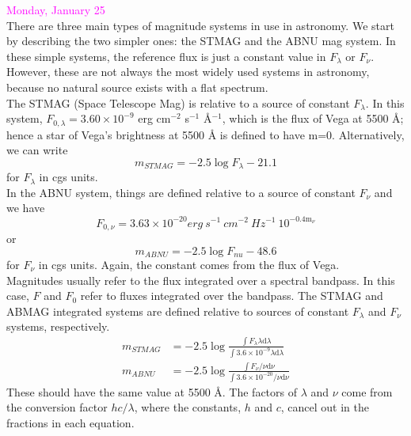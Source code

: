 \documentclass[12pt]{article}
\begin{document}
\noindent \textcolor{magenta}{Monday, January 25}\\

\noindent There are three main types of magnitude systems in use in astronomy.
We start by describing the two simpler ones: the STMAG and the ABNU mag system.
In these simple systems, the reference flux is just a constant value in
$F_{\lambda}$ or $F_{\nu}$. However, these are not always the most widely used
systems in astronomy, because no natural source exists with a flat spectrum.\\

\noindent The STMAG (Space Telescope Mag) is relative to a source of
constant $F_{\lambda}$. In this system, $F_{0,\lambda} = 3.60 \times 10^{-9}$
erg cm$^{-2}$ s$^{-1}$ \AA{}$^{-1}$, which is the flux of Vega at
5500 \AA{}; hence a star of Vega's brightness at 5500 \AA{} is defined to
have m=0. Alternatively, we can write
\begin{equation*}
    m_{STMAG} = -2.5 \log F_{\lambda} - 21.1
\end{equation*}
for $F_{\lambda}$ in cgs units.\\

\noindent In the ABNU system, things are defined relative to a source
of constant $F_{\nu}$ and we have
\begin{equation*}
    F_{0,\nu} = 3.63 \times 10^{-20} erg\ s^{-1}\ cm^{-2}\
    Hz^{-1}\ 10^{-0.4 \textrm{m}_{\nu}}
\end{equation*}
or
\begin{equation*}
    m_{ABNU} = -2.5 \log F_{nu} - 48.6
\end{equation*}
for $F_{\nu}$ in cgs units. Again, the constant comes from the flux of
Vega.\\

\noindent Magnitudes usually refer to the flux integrated over a
spectral bandpass. In this case, $F$ and $F_0$ refer to fluxes
integrated over the bandpass. The STMAG and ABMAG integrated systems
are defined relative to sources of constant $F_{\lambda}$ and
$F_{\nu}$ systems, respectively.
\begin{align*}
    m_{STMAG} &= -2.5 \log \frac{\int F_{\lambda} \lambda
    \textrm{d}\lambda}{\int3.6\times10^{-9}\lambda\textrm{d}\lambda}\\
    m_{ABNU} &= -2.5 \log \frac{\int F_{\nu}/ \nu
    \textrm{d}\nu}{\int 3.6 \times 10^{-20}/ \nu\textrm{d}\nu}
\end{align*}
These should have the same value at 5500 \AA{}.
The factors of $\lambda$ and $\nu$ come from the conversion factor
$hc/\lambda$, where the constants, $h$ and $c$, cancel out in the
fractions in each equation.\\
\end{document}
